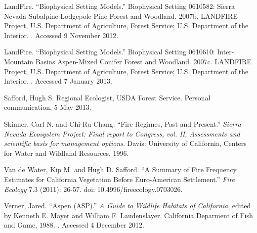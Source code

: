 \begin{hangparas}{.25in}{1}
LandFire. ``Biophysical Setting Models.'' Biophysical Setting 0610582: Sierra Nevada Subalpine Lodgepole Pine Forest and Woodland. 2007b. LANDFIRE Project, U.S. Department of Agriculture, Forest Service; U.S. Department of the Interior. . Accessed 9 November 2012.

LandFire. ``Biophysical Setting Models.'' Biophysical Setting 0610610: Inter-Mountain Basins Aspen-Mixed Conifer Forest and Woodland. 2007c. LANDFIRE Project, U.S. Department of Agriculture, Forest Service; U.S. Department of the Interior. . Accessed 7 January 2013.

Safford, Hugh S. Regional Ecologist, USDA Forest Service. Personal communication, 5 May 2013.

Skinner, Carl N. and Chi-Ru Chang. ``Fire Regimes, Past and Present.'' \emph{Sierra Nevada Ecosystem Project: Final report to Congress, vol. II, Assessments and scientific basis for management options}. Davis: University of California, Centers for Water and Wildland Resources, 1996.

Van de Water, Kip M. and Hugh D. Safford. ``A Summary of Fire Frequency Estimates for California Vegetation Before Euro-American Settlement.'' \emph{Fire Ecology} 7.3 (2011): 26-57. doi: 10.4996/fireecology.0703026.

Verner, Jared. ``Aspen (ASP).'' \emph{A Guide to Wildlife Habitats of California}, edited by Kenneth E. Mayer and William F. Laudenslayer. California Deparment of Fish and Game, 1988. . Accessed 4 December 2012.

\end{hangparas}

